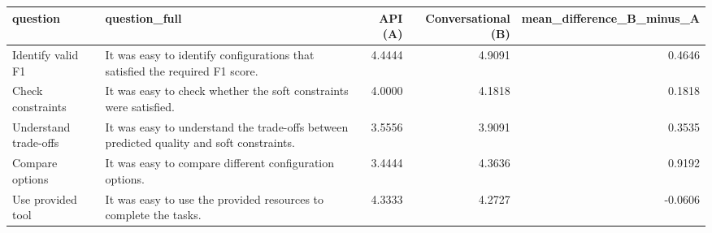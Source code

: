 \begin{tabular}{llrrr}
\toprule
             question &                                                                            question_full &  API (A) &  Conversational (B) &  mean_difference_B_minus_A \\
\midrule
    Identify valid F1 &             It was easy to identify configurations that satisfied the required F1 score. &   4.4444 &              4.9091 &                     0.4646 \\
    Check constraints &                        It was easy to check whether the soft constraints were satisfied. &   4.0000 &              4.1818 &                     0.1818 \\
Understand trade-offs & It was easy to understand the trade-offs between predicted quality and soft constraints. &   3.5556 &              3.9091 &                     0.3535 \\
      Compare options &                                  It was easy to compare different configuration options. &   3.4444 &              4.3636 &                     0.9192 \\
    Use provided tool &                         It was easy to use the provided resources to complete the tasks. &   4.3333 &              4.2727 &                    -0.0606 \\
\bottomrule
\end{tabular}
